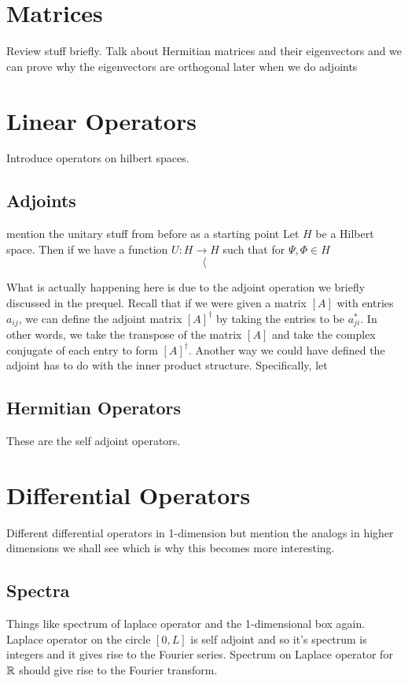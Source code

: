 \section{Matrices}
Review stuff briefly. Talk about Hermitian matrices and their eigenvectors and we can prove why the eigenvectors are orthogonal later when we do adjoints

\section{Linear Operators}
Introduce operators on hilbert spaces.

\subsection{Adjoints}
mention the unitary stuff from before as a starting point
Let $H$ be a Hilbert space. Then if we have a function $U\colon H \to H$ such that for $\Psi,\Phi \in H$
\[
\langle
\]

What is actually happening here is due to the adjoint operation we briefly discussed in the prequel. Recall that if we were given a matrix $[A]$ with entries $a_{ij}$, we can define the adjoint matrix $[A]^\dagger$ by taking the entries to be $a_{ji}^*$. In other words, we take the transpose of the matrix $[A]$ and take the complex conjugate of each entry to form $[A]^\dagger$.  Another way we could have defined the adjoint has to do with the inner product structure.  Specifically, let

\subsection{Hermitian Operators}
These are the self adjoint operators.

\section{Differential Operators}
Different differential operators in 1-dimension but mention the analogs in higher dimensions we shall see which is why this becomes more interesting. 

\subsection{Spectra}

Things like spectrum of laplace operator and the 1-dimensional box again. Laplace operator on the circle $[0,L]$ is self adjoint and so it's spectrum is integers and it gives rise to the Fourier series.  Spectrum on Laplace operator for $\mathbb{R}$ should give rise to the Fourier transform.  